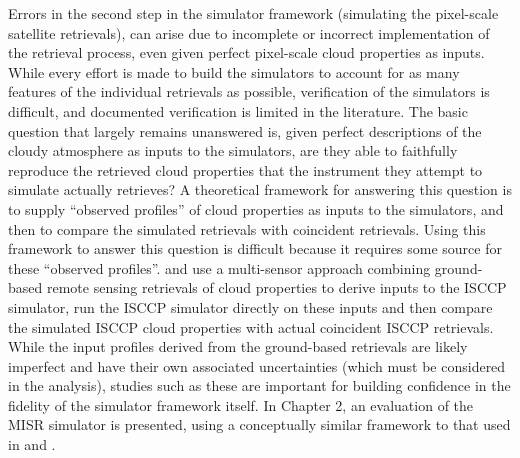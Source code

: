 Errors in the second step in the simulator framework (simulating the
pixel-scale satellite retrievals), can arise due to incomplete or
incorrect implementation of the retrieval process, even given perfect
pixel-scale cloud properties as inputs. While every effort is made to
build the simulators to account for as many features of the individual
retrievals as possible, verification of the simulators is difficult, and
documented verification is limited in the literature. The basic question
that largely remains unanswered is, given perfect descriptions of the
cloudy atmosphere as inputs to the simulators, are they able to
faithfully reproduce the retrieved cloud properties that the instrument
they attempt to simulate actually retrieves? A theoretical framework for
answering this question is to supply ``observed profiles'' of cloud
properties as inputs to the simulators, and then to compare the
simulated retrievals with coincident retrievals. Using this framework to
answer this question is difficult because it requires some source for
these ``observed profiles''. \citet{mace_et_al_2009} and
\citet{mace_et_al_2011} use a multi-sensor approach combining
ground-based remote sensing retrievals of cloud properties to derive
inputs to the ISCCP simulator, run the ISCCP simulator directly on these
inputs and then compare the simulated ISCCP cloud properties with actual
coincident ISCCP retrievals. While the input profiles derived from the
ground-based retrievals are likely imperfect and have their own
associated uncertainties (which must be considered in the analysis),
studies such as these are important for building confidence in the
fidelity of the simulator framework itself. In Chapter 2, an evaluation
of the MISR simulator is presented, using a conceptually similar
framework to that used in \citet{mace_et_al_2009} and
\citet{mace_et_al_2011}.
